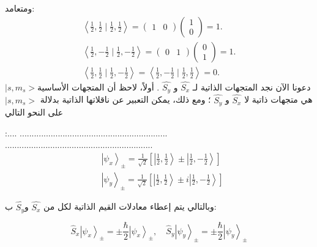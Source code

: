 ومتعامد:
\begin{equation}
	\begin{aligned}
	\left\langle\frac{1}{2}, \frac{1}{2} \mid \frac{1}{2}, \frac{1}{2}\right\rangle  =\left(\begin{array}{ll}
		1 & 0
	\end{array}\right)\left(\begin{array}{l}
		1 \\
		0
	\end{array}\right)=1 . \\
	\left\langle\frac{1}{2},-\frac{1}{2} \mid \frac{1}{2},-\frac{1}{2}\right\rangle  =\left(
	\begin{array}{ll}
		0 & 1
	\end{array}
	\right)\left(\begin{array}{l}
		0 \\
		1
	\end{array}\right)=1 . \\
	\left\langle\frac{1}{2}, \frac{1}{2} \mid \frac{1}{2},-\frac{1}{2}\right\rangle  =\left\langle\frac{1}{2},-\frac{1}{2} \mid \frac{1}{2}, \frac{1}{2}\right\rangle=0 .	\end{aligned}
\end{equation}
دعونا الآن نجد المتجهات الذاتية لـ
 $\hat{S_{x}}$  و 
$\hat{S_{y}}$ 
. أولاً، لاحظ أن المتجهات الأساسية$|s, m_s > $ هي متجهات ذاتية لا  $\hat{S_{x}}$  و 
$\hat{S_{y}}$ 
؛ ومع ذلك، يمكن التعبير عن ناقلاتها الذاتية بدلالة  $|s, m_s > $ على النحو التالي  

:....
..............................................................
..............................................................
\begin{equation}
	\begin{aligned}
		& \left|\psi_x\right\rangle_{ \pm}=\frac{1}{\sqrt{2}}\left[\left|\frac{1}{2}, \frac{1}{2}\right\rangle \pm\left|\frac{1}{2},-\frac{1}{2}\right\rangle\right] \\
		& \left|\psi_y\right\rangle_{ \pm}=\frac{1}{\sqrt{2}}\left[\left|\frac{1}{2}, \frac{1}{2}\right\rangle \pm i\left|\frac{1}{2},-\frac{1}{2}\right\rangle\right] 
	\end{aligned}
\end{equation}

وبالتالي يتم إعطاء معادلات القيم الذاتية لكل من $\hat{S_{x}}$   و$\hat{S_{y}}$  ب:

\begin{equation}
 \hat{S}_x\left|\psi_x\right\rangle_{ \pm}= \pm \frac{\hbar}{2}\left|\psi_x\right\rangle_{ \pm}, \quad \hat{S}_y\left|\psi_y\right\rangle_{ \pm}= \pm \frac{\hbar}{2}\left|\psi_y\right\rangle_{ \pm } 
 \end{equation}


